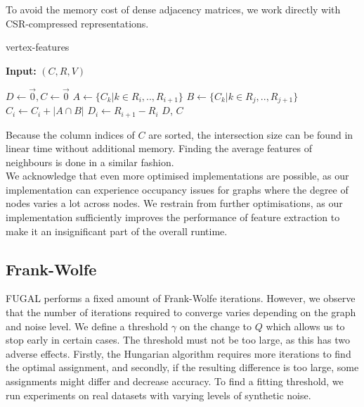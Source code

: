 To avoid the memory cost of dense adjacency matrices, we work directly with CSR-compressed representations. 

\begin{algorithm}[H]
\caption{vertex-features}\label{alg:cugal-vertex-features}
\textbf{Input:} $(C, R, V)$ 
\begin{algorithmic}[1]
\State $D \gets \vec{0}, C \gets \vec{0}$ 
 
     
        \State $A \gets \{ C_k | k \in R_i, .., R_{i + 1} \}$
        \State $B \gets \{ C_k | k \in R_j, .., R_{j + 1} \}$
        \State $C_i \gets C_i + |A \cap B|$
    \EndFor
    \State $D_i \gets R_{i + 1} - R_i$
\EndFor
\State \Return $D$, $C$
\end{algorithmic}
\end{algorithm}

Because the column indices of $C$ are sorted, the intersection size can be found in linear time without additional memory. Finding the average features of neighbours is done in a similar fashion.\\

We acknowledge that even more optimised implementations are possible, as our implementation can experience occupancy issues for graphs where the degree of nodes varies a lot across nodes. We restrain from further optimisations, as our implementation sufficiently improves the performance of feature extraction to make it an insignificant part of the overall runtime.

\subsection{Frank-Wolfe}
\textsc{FUGAL} performs a fixed amount of Frank-Wolfe iterations. However, we observe that the number of iterations required to converge varies depending on the graph and noise level. We define a threshold $\gamma$ on the change to $Q$ which allows us to stop early in certain cases. The threshold must not be too large, as this has two adverse effects. Firstly, the Hungarian algorithm requires more iterations to find the optimal assignment, and secondly, if the resulting difference is too large, some assignments might differ and decrease accuracy. To find a fitting threshold, we run experiments on real datasets with varying levels of synthetic noise.\\


